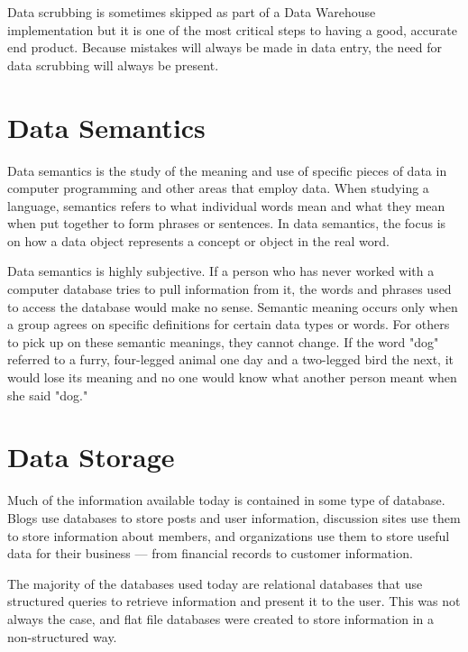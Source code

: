 Data scrubbing is sometimes skipped as part of a Data Warehouse implementation but it is one of the most critical steps to having a good, accurate end product. Because mistakes will always be made in data entry, the need for data scrubbing will always be present.


\section{Data Semantics}
Data semantics is the study of the meaning and use of specific pieces of data in computer programming and other areas that employ data. When studying a language, semantics refers to what individual words mean and what they mean when put together to form phrases or sentences. In data semantics, the focus is on how a data object represents a concept or object in the real word.

Data semantics is highly subjective. If a person who has never worked with a computer database tries to pull information from it, the words and phrases used to access the database would make no sense. Semantic meaning occurs only when a group agrees on specific definitions for certain data types or words. For others to pick up on these semantic meanings, they cannot change. If the word "dog" referred to a furry, four-legged animal one day and a two-legged bird the next, it would lose its meaning and no one would know what another person meant when she said "dog."

\newpage
\section{Data Storage}


Much of the information available today is contained in some type of database. Blogs use databases to store posts and user information, discussion sites use them to store information about members, and organizations use them to store useful data for their business — from financial records to customer information.


The majority of the databases used today are relational databases that use structured queries to retrieve information and present it to the user. This was not always the case, and flat file databases were created to store information in a non-structured way.


